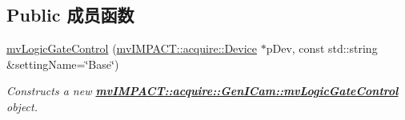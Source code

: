 \subsection*{Public 成员函数}
\begin{DoxyCompactItemize}
\item 
\hyperlink{classmv_i_m_p_a_c_t_1_1acquire_1_1_gen_i_cam_1_1mv_logic_gate_control_a3d5e4d1397ec8548401a5c2ab1a82080}{mv\+Logic\+Gate\+Control} (\hyperlink{classmv_i_m_p_a_c_t_1_1acquire_1_1_device}{mv\+I\+M\+P\+A\+C\+T\+::acquire\+::\+Device} $\ast$p\+Dev, const std\+::string \&setting\+Name=\char`\"{}Base\char`\"{})
\begin{DoxyCompactList}\small\item\em Constructs a new {\bfseries \hyperlink{classmv_i_m_p_a_c_t_1_1acquire_1_1_gen_i_cam_1_1mv_logic_gate_control}{mv\+I\+M\+P\+A\+C\+T\+::acquire\+::\+Gen\+I\+Cam\+::mv\+Logic\+Gate\+Control}} object. \end{DoxyCompactList}\end{DoxyCompactItemize}
